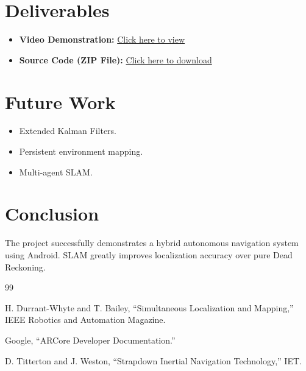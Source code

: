 \documentclass[conference]{IEEEtran}
\begin{document}
\section{Deliverables}
\begin{itemize}
\item \textbf{Video Demonstration:} 
\href{https://drive.google.com/file/d/1R3T7pmVKKfZG5sI9E-ViUi_rIJtwWAVJ/view?usp=sharing}{Click here to view}

\item \textbf{Source Code (ZIP File):} 
\href{https://drive.google.com/drive/folders/1zgsUkooMV4mZQ7jU2X09KmtXHL11xYzy?usp=sharing}{Click here to download}
\end{itemize}



\section{Future Work}
\begin{itemize}
\item Extended Kalman Filters.
\item Persistent environment mapping.
\item Multi-agent SLAM.
\end{itemize}

\section{Conclusion}
The project successfully demonstrates a hybrid autonomous navigation system using Android. SLAM greatly improves localization accuracy over pure Dead Reckoning.

\begin{thebibliography}{99}

 H. Durrant-Whyte and T. Bailey, ``Simultaneous Localization and Mapping,'' IEEE Robotics and Automation Magazine.

 Google, ``ARCore Developer Documentation.''

 D. Titterton and J. Weston, ``Strapdown Inertial Navigation Technology,'' IET.

\end{thebibliography}
\end{document}
